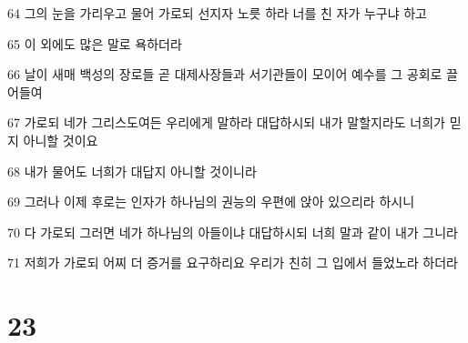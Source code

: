 \par 64 그의 눈을 가리우고 물어 가로되 선지자 노릇 하라 너를 친 자가 누구냐 하고
\par 65 이 외에도 많은 말로 욕하더라
\par 66 날이 새매 백성의 장로들 곧 대제사장들과 서기관들이 모이어 예수를 그 공회로 끌어들여
\par 67 가로되 네가 그리스도여든 우리에게 말하라 대답하시되 내가 말할지라도 너희가 믿지 아니할 것이요
\par 68 내가 물어도 너희가 대답지 아니할 것이니라
\par 69 그러나 이제 후로는 인자가 하나님의 권능의 우편에 앉아 있으리라 하시니
\par 70 다 가로되 그러면 네가 하나님의 아들이냐 대답하시되 너희 말과 같이 내가 그니라
\par 71 저희가 가로되 어찌 더 증거를 요구하리요 우리가 친히 그 입에서 들었노라 하더라

\chapter{23}

